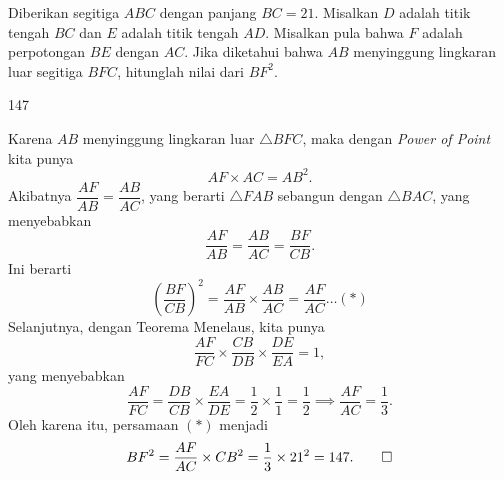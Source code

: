 \documentclass[11pt]{scrartcl}
\begin{document}
	\begin{soaljawab}
		Diberikan segitiga $ABC$ dengan panjang $BC = 21$. Misalkan $D $ adalah titik tengah
		$BC $ dan $E $ adalah titik tengah $AD$. Misalkan pula bahwa $F $ adalah perpotongan $BE$
		dengan $AC$. Jika diketahui bahwa $AB $ menyinggung lingkaran luar segitiga $BFC$,
		hitunglah nilai dari $BF^2$.
		
		\begin{jawaban}
		147
		\end{jawaban}
		\begin{solusi}
		Karena $AB$ menyinggung lingkaran luar $\triangle BFC$, maka dengan \textit{Power of Point} kita punya $$AF \times AC = AB^2.$$ Akibatnya $\dfrac{AF}{AB}=\dfrac{AB}{AC}$, yang berarti $\triangle FAB$ sebangun dengan $\triangle BAC$, yang menyebabkan $$\dfrac{AF}{AB}=\dfrac{AB}{AC}=\dfrac{BF}{CB}.$$ Ini berarti $$\left(\dfrac{BF}{CB}\right)^2=\dfrac{AF}{AB}\times\dfrac{AB}{AC}=\dfrac{AF}{AC}\dots(*)$$ Selanjutnya, dengan Teorema Menelaus, kita punya $$\dfrac{AF}{FC}\times\dfrac{CB}{DB}\times\dfrac{DE}{EA}=1,$$ yang menyebabkan $$\dfrac{AF}{FC}=\dfrac{DB}{CB}\times\dfrac{EA}{DE}=\dfrac{1}{2}\times\dfrac{1}{1}=\dfrac{1}{2} \implies \dfrac{AF}{AC} = \dfrac{1}{3}.$$ Oleh karena itu, persamaan $(*)$ menjadi $$BF^2=\dfrac{AF}{AC}\times CB^2=\dfrac{1}{3}\times 21^2=147.\qed $$ 
		\end{solusi}
	\end{soaljawab}
\end{document}
